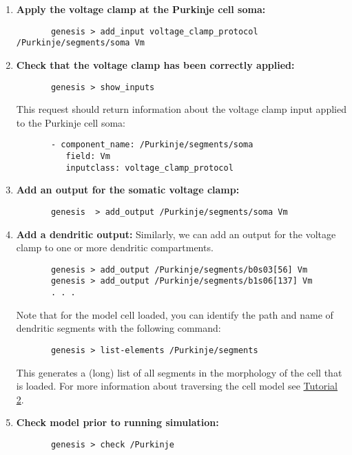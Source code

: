 \documentclass[12pt]{article}
\begin{document}
\begin{enumerate}
	\item{\bf Apply the voltage clamp at the Purkinje cell soma:}
	\begin{verbatim}
	   genesis > add_input voltage_clamp_protocol /Purkinje/segments/soma Vm
	\end{verbatim}
	
	\item{\bf Check that the voltage clamp has been correctly applied:}
	\begin{verbatim}
	   genesis > show_inputs
	\end{verbatim}
	This request should return information about the voltage clamp input applied to the Purkinje cell soma:
	\begin{verbatim}
	   - component_name: /Purkinje/segments/soma
	      field: Vm
	      inputclass: voltage_clamp_protocol
	   \end{verbatim}
	
	\item{\bf Add an output for the somatic voltage clamp:}
	\begin{verbatim}
	   genesis  > add_output /Purkinje/segments/soma Vm
	\end{verbatim}
	
	\item{\bf Add a dendritic output:} Similarly, we can add an output for the voltage clamp to one or more dendritic compartments.
	\begin{verbatim}
	   genesis > add_output /Purkinje/segments/b0s03[56] Vm
	   genesis > add_output /Purkinje/segments/b1s06[137] Vm
	   . . .
	\end{verbatim}
	Note that for the model cell loaded, you can identify the path and name of dendritic segments with the following command:
	\begin{verbatim}
	   genesis > list-elements /Purkinje/segments
	\end{verbatim}	
	This generates a (long) list of all segments in the morphology of the cell that is loaded. For more information about traversing the cell model see \href{../tutorial1/tutorial2.pdf}{Tutorial 2}.
	
         \item{\bf Check model prior to running simulation:}
	\begin{verbatim}
	   genesis > check /Purkinje
	\end{verbatim}

\end{enumerate}
\end{document}
